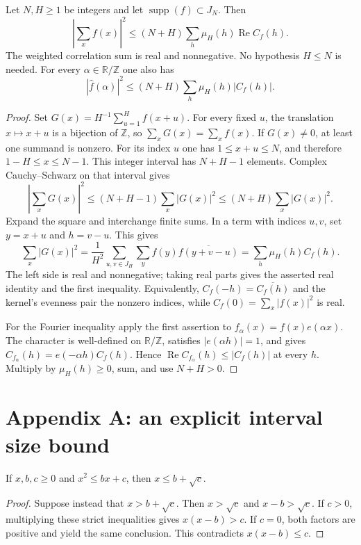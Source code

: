 \begin{lemma}
\leanok
\label{core:van-der-corput}
Let $N,H\geq1$ be integers and let $\operatorname{supp}(f)\subset J_N$.
Then
\[
 \left|\sum_x f(x)\right|^2
 \leq (N+H)\sum_h\mu_H(h)\operatorname{Re} C_f(h).
\]
The weighted correlation sum is real and nonnegative.  No hypothesis
$H\leq N$ is needed.  For every $\alpha\in\mathbb R/\mathbb Z$ one also
has
\[
 |\widehat f(\alpha)|^2
 \leq (N+H)\sum_h\mu_H(h)|C_f(h)|.
\]
\end{lemma}
\begin{proof}
Set $G(x)=H^{-1}\sum_{u=1}^H f(x+u)$.  For every fixed $u$, the
translation $x\mapsto x+u$ is a bijection of $\mathbb Z$, so
$\sum_xG(x)=\sum_xf(x)$.  If $G(x)\ne0$, at least one summand
is nonzero.  For its index $u$ one has $1\leq x+u\leq N$,
and therefore $1-H\leq x\leq N-1$.  This integer interval has
$N+H-1$ elements.  Complex Cauchy--Schwarz on that interval gives
\[
 |\sum_xG(x)|^2\leq (N+H-1)\sum_x|G(x)|^2
                         \leq (N+H)\sum_x|G(x)|^2.
\]
Expand the square and interchange finite sums.  In a term with
indices $u,v$, set $y=x+u$ and $h=v-u$.  This gives
\[
 \sum_x|G(x)|^2
 =\frac1{H^2}\sum_{u,v\in J_H}\sum_y
                  f(y)\overline{f(y+v-u)}
 =\sum_h\mu_H(h)C_f(h).
\]
The left side is real and nonnegative; taking real parts gives
the asserted real identity and the first inequality.  Equivalently,
$C_f(-h)=\overline{C_f(h)}$ and the kernel's evenness pair the
nonzero indices, while $C_f(0)=\sum_x|f(x)|^2$ is real.

For the Fourier inequality apply the first assertion to
$f_\alpha(x)=f(x)e(\alpha x)$.  The character is well-defined on
$\mathbb R/\mathbb Z$, satisfies $|e(\alpha h)|=1$, and gives
$C_{f_\alpha}(h)=e(-\alpha h)C_f(h)$.  Hence
$\operatorname{Re} C_{f_\alpha}(h)\leq|C_f(h)|$ at every $h$.
Multiply by $\mu_H(h)\geq0$, sum, and use $N+H>0$.
\end{proof}

\section{Appendix A: an explicit interval size bound}

\begin{lemma}
\leanok
\label{core:quadratic-bound}
If $x,b,c\geq0$ and $x^2\leq bx+c$, then $x\leq b+\sqrt c$.
\end{lemma}
\begin{proof}
Suppose instead that $x>b+\sqrt c$.  Then $x>\sqrt c$ and
$x-b>\sqrt c$.  If $c>0$, multiplying these strict inequalities
gives $x(x-b)>c$.  If $c=0$, both factors are positive and yield
the same conclusion.  This contradicts $x(x-b)\leq c$.
\end{proof}

